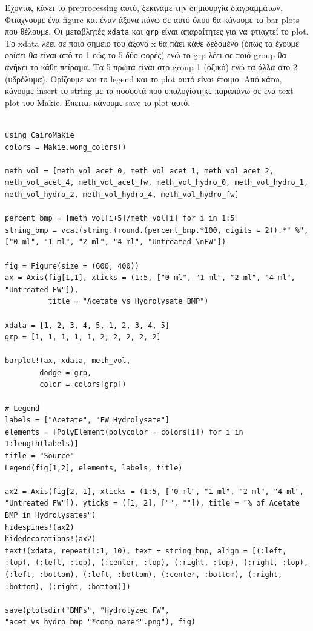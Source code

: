 \documentclass[11pt]{article}
\begin{document}
Έχοντας κάνει το preprocessing αυτό, ξεκινάμε την δημιουργία διαγραμμάτων. Φτιάχνουμε ένα figure και έναν άξονα πάνω σε αυτό όπου θα κάνουμε τα bar plots που θέλουμε. Οι μεταβλητές \texttt{xdata} και \texttt{grp} είναι απαραίτητες για να φτιαχτεί το plot. Το xdata λέει σε ποιό σημείο του άξονα x θα πάει κάθε δεδομένο (όπως τα έχουμε ορίσει θα είναι από το 1 εώς το 5 δύο φορές) ενώ το grp λέει σε ποιό group θα ανήκει το κάθε πείραμα. Τα 5 πρώτα είναι στο group 1 (οξικό) ενώ τα άλλα στο 2 (υδρόλυμα). Ορίζουμε και το legend και το plot αυτό είναι έτοιμο. Από κάτω, κάνουμε insert το string με τα ποσοστά που υπολογίστηκε παραπάνω σε ένα text plot του Makie. Έπειτα, κάνουμε save το plot αυτό.

\begin{verbatim}

using CairoMakie
colors = Makie.wong_colors()

meth_vol = [meth_vol_acet_0, meth_vol_acet_1, meth_vol_acet_2, meth_vol_acet_4, meth_vol_acet_fw, meth_vol_hydro_0, meth_vol_hydro_1, meth_vol_hydro_2, meth_vol_hydro_4, meth_vol_hydro_fw]

percent_bmp = [meth_vol[i+5]/meth_vol[i] for i in 1:5]
string_bmp = vcat(string.(round.(percent_bmp.*100, digits = 2)).*" %", ["0 ml", "1 ml", "2 ml", "4 ml", "Untreated \nFW"])

fig = Figure(size = (600, 400))
ax = Axis(fig[1,1], xticks = (1:5, ["0 ml", "1 ml", "2 ml", "4 ml", "Untreated FW"]),
          title = "Acetate vs Hydrolysate BMP")

xdata = [1, 2, 3, 4, 5, 1, 2, 3, 4, 5]
grp = [1, 1, 1, 1, 1, 2, 2, 2, 2, 2]

barplot!(ax, xdata, meth_vol,
        dodge = grp,
        color = colors[grp])

# Legend
labels = ["Acetate", "FW Hydrolysate"]
elements = [PolyElement(polycolor = colors[i]) for i in 1:length(labels)]
title = "Source"
Legend(fig[1,2], elements, labels, title)

ax2 = Axis(fig[2, 1], xticks = (1:5, ["0 ml", "1 ml", "2 ml", "4 ml", "Untreated FW"]), yticks = ([1, 2], ["", ""]), title = "% of Acetate BMP in Hydrolysates")
hidespines!(ax2)
hidedecorations!(ax2)
text!(xdata, repeat(1:1, 10), text = string_bmp, align = [(:left, :top), (:left, :top), (:center, :top), (:right, :top), (:right, :top), (:left, :bottom), (:left, :bottom), (:center, :bottom), (:right, :bottom), (:right, :bottom)])

save(plotsdir("BMPs", "Hydrolyzed FW", "acet_vs_hydro_bmp_"*comp_name*".png"), fig)
\end{verbatim}
\end{document}
